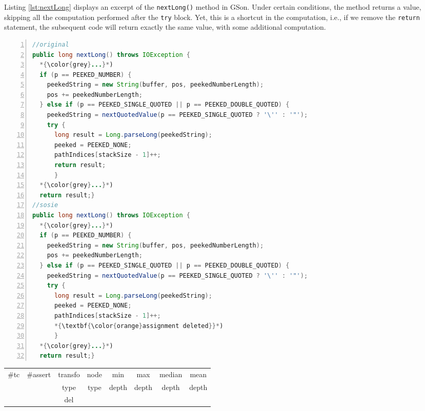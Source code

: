 Listing \ref{lst:nextLong} displays an excerpt of the \texttt{nextLong()} method in GSon. 
Under certain conditions, the method returns a value, skipping all the computation performed after the \texttt{try} block. 
Yet, this is a shortcut in the computation, i.e., if we remove the \texttt{return} statement, the subsequent code will return exactly the same value, with some additional computation. 

\begin{minipage}{\columnwidth}
\begin{lstlisting}[caption={\texttt{nextLong} in GSon and a sosie},label={lst:nextLong},language=java,numbers=left]
//original
public long nextLong() throws IOException {
  *{\color{grey}...}*)
  if (p == PEEKED_NUMBER) {
    peekedString = new String(buffer, pos, peekedNumberLength);
    pos += peekedNumberLength;
  } else if (p == PEEKED_SINGLE_QUOTED || p == PEEKED_DOUBLE_QUOTED) {
    peekedString = nextQuotedValue(p == PEEKED_SINGLE_QUOTED ? '\'' : '"');
    try {
      long result = Long.parseLong(peekedString);
      peeked = PEEKED_NONE;
      pathIndices[stackSize - 1]++;
      return result; 
      } 
  *{\color{grey}...}*)
  return result;}
//sosie
public long nextLong() throws IOException {
  *{\color{grey}...}*)
  if (p == PEEKED_NUMBER) {
    peekedString = new String(buffer, pos, peekedNumberLength);
    pos += peekedNumberLength;
  } else if (p == PEEKED_SINGLE_QUOTED || p == PEEKED_DOUBLE_QUOTED) {
    peekedString = nextQuotedValue(p == PEEKED_SINGLE_QUOTED ? '\'' : '"');
    try {
      long result = Long.parseLong(peekedString);
      peeked = PEEKED_NONE;
      pathIndices[stackSize - 1]++;
      *{\textbf{\color{orange}assignment deleted}}*)
      } 
  *{\color{grey}...}*)
  return result;}
\end{lstlisting}
\tabcolsep=0.11cm
\begin{tabular}{>{\small}c>{\small}c>{\small}c>{\small}c>{\small}c>{\small}c>{\small}c>{\small}c}
\hline
\rowcolor{lightgray} \#tc & \#assert & transfo & node & min & max & median & mean   \\
\rowcolor{lightgray}  & & type & type & depth  & depth & depth & depth  \\ 
\hline
&  & del &  &  &  &  & \\
\hline
\end{tabular}
\end{minipage}
